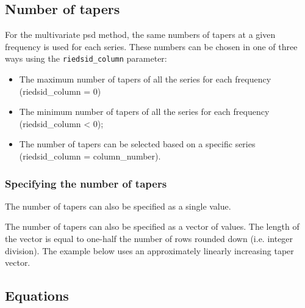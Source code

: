 \documentclass[11pt]{article}\usepackage[]{graphicx}\usepackage[]{xcolor}
\newcommand{\Rcmd}[1]{\texttt{#1}}
\begin{document}










\clearpage

\subsection{Number of tapers}

For the multivariate psd method, the same numbers of tapers at a given frequency is used for each series. These numbers can be chosen in one of three ways using the \Rcmd{riedsid\_column} parameter:

\begin{itemize}
\item The maximum number of tapers of all the series for each frequency (riedsid\_column = 0)
\item The minimum number of tapers of all the series for each frequency (riedsid\_column < 0);
\item The number of tapers can be selected based on a specific series (riedsid\_column = column\_number).
\end{itemize}




\subsubsection{Specifying the number of tapers}

The number of tapers can also be specified as a single value.



The number of tapers can also be specified as a vector of values.  The length of the vector is equal to one-half the number of rows rounded down (i.e. integer division). The example below uses an approximately linearly increasing taper vector.



\newpage 

\subsection{Equations}
\end{document}
